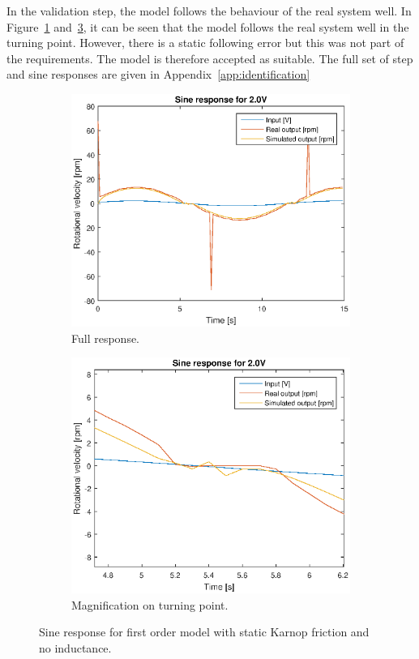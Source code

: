 In the validation step, the model follows the behaviour of the real system well.
In Figure~\ref{fig:1storder_f_sine2} and~\ref{fig:1storder_f_sine2z}, it can be
seen that the model follows the real system well in the turning point. However,
there is a static following error but this was not part of the requirements. The
model is therefore accepted as suitable. The full set of step and sine responses
are given in Appendix~\ref{app:identification}
\begin{figure}[H]
    \centering
    \begin{subfigure}[H]{0.48\textwidth}
    \includegraphics[width=\textwidth]{./img/testrig_2Vsine_no_i_fric.eps}
    \caption{Full response.}\label{fig:1storder_f_sine2}
    \end{subfigure}
    \begin{subfigure}[H]{0.48\textwidth}
    \includegraphics[width=\textwidth]{./img/testrig_2Vsine_no_i_fric_zoom.eps}
    \caption{Magnification on turning point.}\label{fig:1storder_f_sine2z}
    \end{subfigure}
    \caption{Sine response for first order model with static Karnop friction and 
    no inductance.}
\end{figure}

